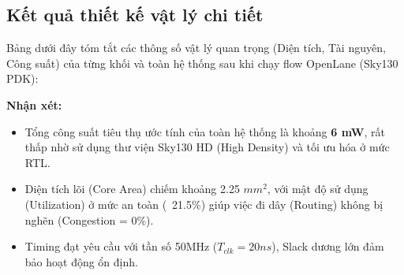 \documentclass[12pt,a4paper]{report}
\begin{document}
\subsection{Kết quả thiết kế vật lý chi tiết}
Bảng dưới đây tóm tắt các thông số vật lý quan trọng (Diện tích, Tài nguyên, Công suất) của từng khối và toàn hệ thống sau khi chạy flow OpenLane (Sky130 PDK):

\begin{table}[H]
\centering
\caption{Tổng hợp kết quả tổng hợp vật lý (OpenLane Metrics)}
\label{tab:openlane_metrics}
\end{table}

\textbf{Nhận xét:}
\begin{itemize}
    \item Tổng công suất tiêu thụ ước tính của toàn hệ thống là khoảng \textbf{6 mW}, rất thấp nhờ sử dụng thư viện Sky130 HD (High Density) và tối ưu hóa ở mức RTL.
    \item Diện tích lõi (Core Area) chiếm khoảng 2.25 $mm^2$, với mật độ sử dụng (Utilization) ở mức an toàn (~21.5\%) giúp việc đi dây (Routing) không bị nghẽn (Congestion = 0\%).
    \item Timing đạt yêu cầu với tần số 50MHz ($T_{clk}=20ns$), Slack dương lớn đảm bảo hoạt động ổn định.
\end{itemize}
\end{document}
